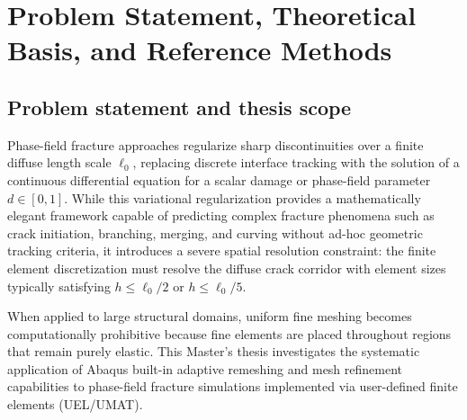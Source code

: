 \chapter{Problem Statement, Theoretical Basis, and Reference Methods}
\label{ch:introduction}

\section{Problem statement and thesis scope}
Phase-field fracture approaches regularize sharp discontinuities over a finite diffuse length scale $\ell_0$, replacing discrete interface tracking with the solution of a continuous differential equation for a scalar damage or phase-field parameter $d \in [0, 1]$. While this variational regularization provides a mathematically elegant framework capable of predicting complex fracture phenomena such as crack initiation, branching, merging, and curving without ad-hoc geometric tracking criteria, it introduces a severe spatial resolution constraint: the finite element discretization must resolve the diffuse crack corridor with element sizes typically satisfying $h \le \ell_0 / 2$ or $h \le \ell_0 / 5$.

When applied to large structural domains, uniform fine meshing becomes computationally prohibitive because fine elements are placed throughout regions that remain purely elastic. This Master's thesis investigates the systematic application of Abaqus built-in adaptive remeshing and mesh refinement capabilities to phase-field fracture simulations implemented via user-defined finite elements (UEL/UMAT). 

